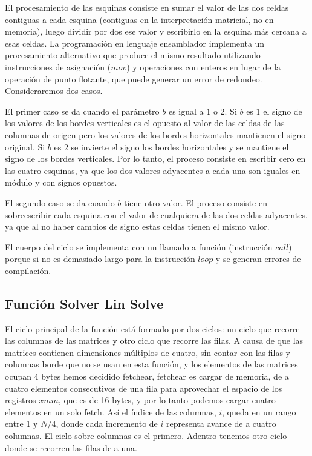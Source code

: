 \par El procesamiento de las esquinas consiste en sumar el valor de las dos celdas contiguas a cada esquina (contiguas en la interpretación matricial, no en memoria), luego dividir por dos ese valor y escribirlo en la esquina más cercana a esas celdas. La programación en lenguaje ensamblador implementa un procesamiento alternativo que produce el mismo resultado utilizando instrucciones de asignación ($mov$) y operaciones con enteros en lugar de la operación de punto flotante, que puede generar un error de redondeo. Consideraremos dos casos.\newline
\par El primer caso se da cuando el parámetro $b$ es igual a $1$ o $2$. Si $b$ es $1$ el signo de los valores de los bordes verticales es el opuesto al valor de las celdas de las columnas de origen pero los valores de los bordes horizontales mantienen el signo original. Si $b$ es $2$ se invierte el signo los bordes horizontales y se mantiene el signo de los bordes verticales. Por lo tanto, el proceso consiste en escribir cero en las cuatro esquinas, ya que los dos valores adyacentes a cada una son iguales en módulo y con signos opuestos.\newline
\par El segundo caso se da cuando $b$ tiene otro valor. El proceso consiste en sobreescribir cada esquina con el valor de cualquiera de las dos celdas adyacentes, ya que al no haber cambios de signo estas celdas tienen el mismo valor.\newline
\par El cuerpo del ciclo se implementa con un llamado a función (instrucción $call$) porque si no es demasiado largo para la instrucción $loop$ y se generan errores de compilación.\newline

\subsection{Función Solver Lin Solve}
\par El ciclo principal de la función está formado por dos ciclos: un ciclo que recorre las columnas de las matrices y otro ciclo que recorre las filas. A causa de que las matrices contienen dimensiones múltiplos de cuatro, sin contar con las filas y columnas borde que no se usan en esta función, y los elementos de las matrices ocupan 4 bytes hemos decidido fetchear, fetchear es cargar de memoria, de a cuatro elementos consecutivos de una fila para aprovechar el espacio de los registros $xmm$, que es de 16 bytes, y por lo tanto podemos cargar cuatro elementos en un solo fetch. Así el índice de
las columnas, $i$, queda en un rango entre 1 y $N/4$, donde cada incremento de $i$ representa avance de a cuatro columnas. El ciclo sobre columnas es el primero. Adentro tenemos otro ciclo donde se recorren las filas de a una. \newline

